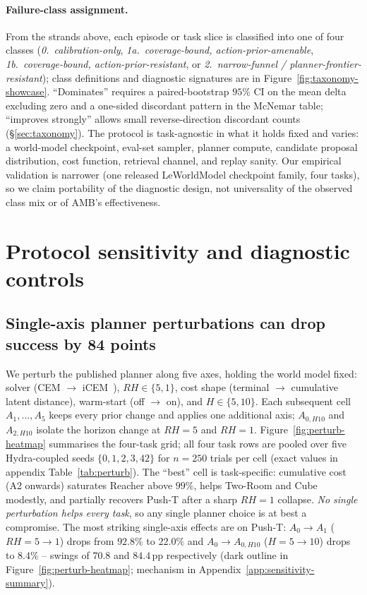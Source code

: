 \documentclass{article}
\begin{document}
\paragraph{Failure-class assignment.}
From the strands above, each episode or task slice is classified into one of four classes (\emph{0.~calibration-only}, \emph{1a.~coverage-bound, action-prior-amenable}, \emph{1b.~coverage-bound, action-prior-resistant}, or \emph{2.~narrow-funnel / planner-frontier-resistant}); class definitions and diagnostic signatures are in Figure~\ref{fig:taxonomy-showcase}. ``Dominates'' requires a paired-bootstrap $95\%$ CI on the mean delta excluding zero and a one-sided discordant pattern in the McNemar table; ``improves strongly'' allows small reverse-direction discordant counts (\S\ref{sec:taxonomy}). The protocol is task-agnostic in what it holds fixed and varies: a world-model checkpoint, eval-set sampler, planner compute, candidate proposal distribution, cost function, retrieval channel, and replay sanity. Our empirical validation is narrower (one released LeWorldModel checkpoint family, four tasks), so we claim portability of the diagnostic design, not universality of the observed class mix or of AMB's effectiveness.

\section{Protocol sensitivity and diagnostic controls}
\label{sec:sensitivity}

\subsection{Single-axis planner perturbations can drop success by 84 points}
\label{subsec:perturb-grid}

We perturb the published planner along five axes, holding the world model fixed: solver (CEM $\to$ iCEM~\cite{pinneri2020icem}), $RH \in \{5, 1\}$, cost shape (terminal $\to$ cumulative latent distance), warm-start (off $\to$ on), and $H \in \{5, 10\}$. Each subsequent cell $A_1,\dots,A_5$ keeps every prior change and applies one additional axis; $A_{0,H10}$ and $A_{2,H10}$ isolate the horizon change at $RH{=}5$ and $RH{=}1$. Figure~\ref{fig:perturb-heatmap} summarises the four-task grid; all four task rows are pooled over five Hydra-coupled seeds $\{0,1,2,3,42\}$ for $n=250$ trials per cell (exact values in appendix Table~\ref{tab:perturb}). The ``best'' cell is task-specific: cumulative cost (A2 onwards) saturates Reacher above $99\%$, helps Two-Room and Cube modestly, and partially recovers Push-T after a sharp $RH{=}1$ collapse. \emph{No single perturbation helps every task}, so any single planner choice is at best a compromise. The most striking single-axis effects are on Push-T: $A_0 \to A_1$ ($RH{=}5{\to}1$) drops from $92.8\%$ to $22.0\%$ and $A_0 \to A_{0,H10}$ ($H{=}5{\to}10$) drops to $8.4\%$ -- swings of $70.8$ and $84.4$\,pp respectively (dark outline in Figure~\ref{fig:perturb-heatmap}; mechanism in Appendix~\ref{app:sensitivity-summary}).
\end{document}
